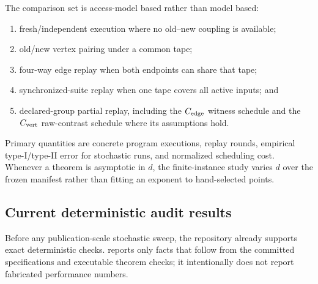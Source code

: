 The comparison set is access-model based rather than model based:
\begin{enumerate}[leftmargin=1.6em,itemsep=2pt]
\item fresh/independent execution where no old--new coupling is available;
\item old/new vertex pairing under a common tape;
\item four-way edge replay when both endpoints can share that tape;
\item synchronized-suite replay when one tape covers all active inputs; and
\item declared-group partial replay, including the $C_{\rm edge}$ witness
schedule and the $C_{\rm vert}$ raw-contrast schedule where its assumptions hold.
\end{enumerate}
Primary quantities are concrete program executions, replay rounds, empirical
type-I/type-II error for stochastic runs, and normalized scheduling cost.
Whenever a theorem is asymptotic in $d$, the finite-instance study varies $d$
over the frozen manifest rather than fitting an exponent to hand-selected
points.

\subsection{Current deterministic audit results}

Before any publication-scale stochastic sweep, the repository already supports
exact deterministic checks.  reports only
facts that follow from the committed specifications and executable theorem
checks; it intentionally does not report fabricated performance numbers.

